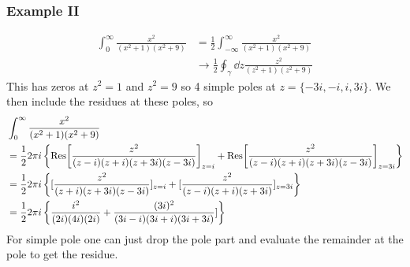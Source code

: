 \documentclass[a4paper,12pt]{article}
\begin{document}
\subsubsection{Example II}
\begin{equation}
\begin{aligned}
\int_{0}^{\infty}\frac{x^2}{(x^2+1)(x^2+9)}&=\frac{1}{2}\int_{-\infty}^{\infty}\frac{x^2}{(x^2+1)(x^2+9)}\\
&\to \frac{1}{2}\oint_\gamma \dd z \frac{z^2}{(z^2+1)(z^2+9)}
\end{aligned}
\end{equation}
This has zeros at $z^2=1$ and $z^2=9$ so 4 simple poles at $z=\{-3i,-i,i,3i\}$. We then include the residues at these poles, so
\begin{equation}
\begin{aligned}
	&\int_{0}^{\infty}\frac{x^2}{(x^2+1)(x^2+9)}\\
	&=\frac{1}{2}2\pi i \left\{
	\Res[\frac{z^2}{(z-i)(z+i)(z+3i)(z-3i)}]_{z=i}+	\Res[\frac{z^2}{(z-i)(z+i)(z+3i)(z-3i)}]_{z=3i}
	\right\}\\
	&=\frac{1}{2}2\pi i \left\{[\frac{z^2}{(z+i)(z+3i)(z-3i)}]_{z=i}+	[\frac{z^2}{(z-i)(z+i)(z+3i)}]_{z=3i}
	\right\}\\
	&=\frac{1}{2}2\pi i \left\{\frac{i^2}{(2i)(4i)(2i)}+\frac{(3i)^2}{(3i-i)(3i+i)(3i+3i)}]
	\right\}
\end{aligned}
\end{equation}
For simple pole one can just drop the pole part and evaluate the remainder at the pole to get the residue.\\
\end{document}

